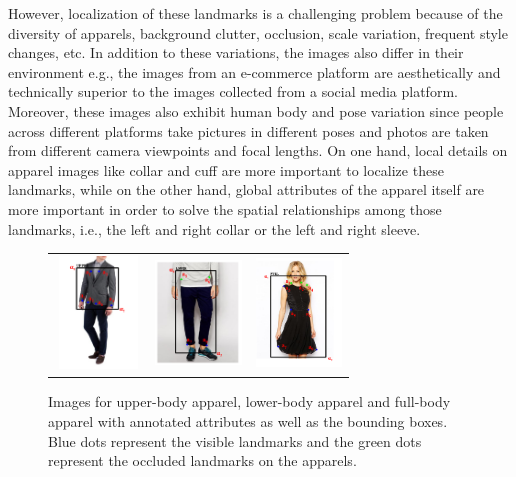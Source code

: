 \documentclass[conference]{IEEEtran}
\begin{document}
However, localization of these landmarks is a challenging problem because of the diversity of apparels, background clutter, occlusion, scale variation, frequent style changes, etc. In addition to these variations, the images also differ in their environment e.g., the images from an e-commerce platform are aesthetically and technically superior \cite{talebi2018nima} to the images collected from a social media platform. Moreover, these images also exhibit human body and pose variation since people across different platforms take pictures in different poses and photos are
taken from different camera viewpoints and focal lengths. On one hand, local details on apparel images like collar and cuff are more important to localize these landmarks, while on the other hand, global attributes of the apparel itself are more important in order to solve the spatial relationships among those landmarks, i.e., the left and right collar or the left and right sleeve.
\begin{figure}[ht]
    \centering
        \begin{tabular}{ccc}
            {\includegraphics [width = 0.9in, height= 3cm]{images/anno_upper.PNG}} & 
            {\includegraphics [width = 0.9in, height= 3cm]{images/anno_lower.PNG}} & 
            {\includegraphics [width = 0.9in, height= 3cm]{images/anno_full.PNG}} \\
        \end{tabular}
        \caption{Images for upper-body apparel, lower-body apparel and full-body apparel with annotated attributes as well as the bounding boxes. Blue dots  represent the visible landmarks and the green dots represent the occluded landmarks on the apparels.}
\end{figure}
\end{document}
